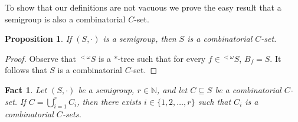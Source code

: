 \documentclass{article}
\theoremstyle{plain}
\newtheorem{prop}[thm]{Proposition}
\newtheorem{fact}[thm]{Fact}
\theoremstyle{definition}
\newcommand{\bbN}{\mathbb{N}}
\begin{document}
To show that our definitions are not vacuous we prove the easy result
that a semigroup is also a combinatorial $C$-set.
\begin{prop}
  If $(S, \cdot)$ is a semigroup, then $S$ is a combinatorial $C$-set.
\end{prop}
\begin{proof}
  Observe that ${}^{<\omega}{S}$ is a \mbox{$*$-tree} such that for
  every $f \in {}^{<\omega}{S}$, $B_f = S$. 
  It follows that $S$ is a combinatorial $C$-set.
\end{proof}

\begin{fact}
  Let $(S, \cdot)$ be a semigroup, $r \in \bbN$, and let $C \subseteq
  S$ be a combinatorial $C$-set. 
  If $C = \bigcup_{i=1}^r C_i$, then there exists $i \in \{1, 2,
  \ldots, r\}$ such that $C_i$ is a combinatorial $C$-sets.
\end{fact}
\end{document}
